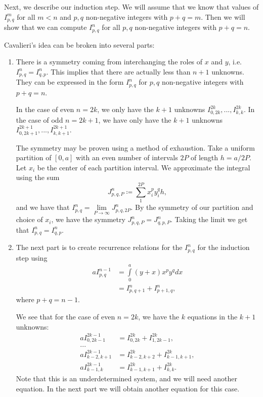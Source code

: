 Next, we describe our induction step. We will assume that we know that values of \(I^m_{p, q}\) for all
\(m < n\) and \(p, q\) non-negative integers with \(p + q = m\). Then we will show that we can compute
\(I^n_{p, q}\) for all \(p, q\) non-negative integers with \(p + q = n\).

Cavalieri's idea can be broken into several parts:
\begin{enumerate}
\item There is a symmetry coming from interchanging the roles of \(x\) and \(y\), i.e. \(I^n_{p, q} = I^n_{q, p}\). 
This implies that there are actually less than \(n+1\) unknowns. They can be expressed in the form
\(I^n_{p, q}\) for \(p, q\) non-negative integers with \(p + q = n\).

In the case of even \(n = 2k\), we only have the
\(k+1\) unknowns \(I^{2k}_{0, 2k}, ..., I^{2k}_{k, k}\). In the case of odd \(n = 2k + 1\), we have only have the
\(k+1\) unknowns \(I^{2k+1}_{0, 2k+1}, ..., I^{2k+1}_{k, k+1}\).

The symmetry may be proven using a method of exhaustion. Take a uniform partition of \([0, a]\) with an even
number of intervals \(2P\) of length \(h = a/2P\). Let \(x_i\) be the center of each partition interval.
We approximate the integral using the sum
\begin{equation}
J^n_{p, q, P} \coloneqq \sum\limits_1^{2P} x_i^p y_i^q h,
\end{equation}
and we have that \(I^n_{p, q}  = \lim\limits_{P \to \infty} J^n_{p, q, 2P}\). By the symmetry of our partition
and choice of \(x_i\), we have the symmetry \(J^n_{p, q, P} = J^n_{q, p, P}\). Taking the limit we get that
\(I^n_{p, q} = I^n_{q, p}\). 

\item The next part is to create recurrence relations for the \(I^n_{p, q}\) for the induction step using
\begin{align}
a I^{n-1}_{p, q} & = \int\limits_0^a (y + x)x^p y^q dx \\ 
    & = I^{n}_{p, q+1} + I^n_{p+1, q},
\end{align} 
where \(p + q = n-1\).

We see that for the case of even \(n = 2k\), we have the \(k\) equations in the \(k+1\) unknowns:
\begin{align}
aI^{2k-1}_{0, 2k-1} & = I^{2k}_{0, 2k} + I^{2k}_{1, 2k-1}, \\
... & \\
aI^{2k-1}_{k-2, k+1} & = I^{2k}_{k-2, k+2} + I^{2k}_{k-1, k+1}, \\
aI^{2k-1}_{k-1, k} & = I^{2k}_{k-1, k+1} + I^{2k}_{k, k}. 
\end{align}
Note that this is an underdetermined system, and we will need another equation. In the next part we will
obtain another equation for this case.


\end{enumerate}

